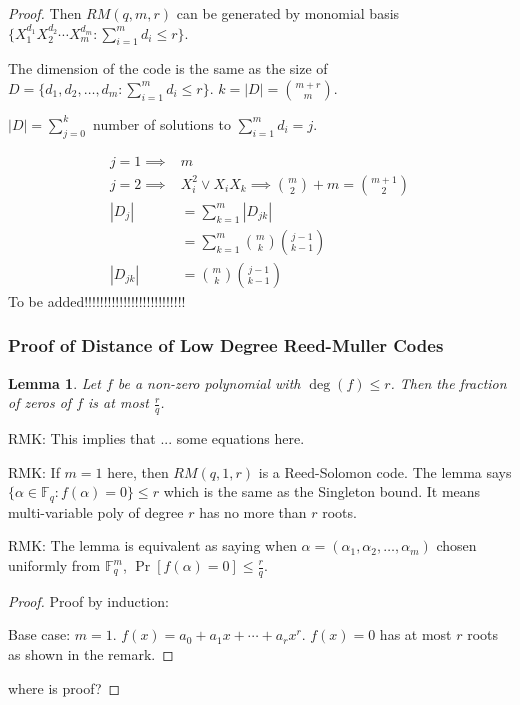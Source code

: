\documentclass[letterpaper,12pt]{article}
\newtheorem{lemma}{Lemma}
\begin{document}
\begin{proof}
    Then $RM(q,m,r)$ can be generated by monomial basis $\{X_1^{d_1}X_2^{d_2}\cdots X_m^{d_m}: \sum_{i=1}^{m}d_i\le r\}$.

    The dimension of the code is the same as the size of $D=\{d_1,d_2,\ldots,d_m: \sum_{i=1}^{m}d_i\le r\}$. $k=|D|=\binom{m+r}{m}$.

    $|D|=\sum_{j=0}^{k}$ number of solutions to $\sum_{i=1}^{m}d_i=j$.

    \begin{align*}
        j=1 \implies & m \\ 
        j=2 \implies & X_i^2 \lor X_i X_k\implies \binom{m}{2} + m = \binom{m+1}{2} \\
        |D_j| & =  \sum_{k=1}^{m} |D_{jk}| \\
        & = \sum_{k=1}^{m} \binom{m}{k} \binom{j-1}{k-1} \\
        |D_{jk}| & = \binom{m}{k} \binom{j-1}{k-1}
    \end{align*}
    To be added!!!!!!!!!!!!!!!!!!!!!!!!!!

\subsubsection{Proof of Distance of Low Degree Reed-Muller Codes}
\begin{lemma}
    Let $f$ be a non-zero polynomial with $\deg(f)\le r$. Then the fraction of zeros of $f$ is at most $\frac{r}{q}$. 
\end{lemma}
RMK: This implies that ... some equations here.

RMK: If $m=1$ here, then $RM(q,1,r)$ is a Reed-Solomon code. The lemma says $\{\alpha\in\mathbb{F}_q : f(\alpha)=0\}\le r$ which is the same as the Singleton bound. It means multi-variable poly of degree $r$ has no more than $r$ roots. 

RMK: The lemma is equivalent as saying when $\alpha = (\alpha_1,\alpha_2,\ldots,\alpha_m)$ chosen uniformly from $\mathbb{F}_q^m$, $\Pr[f(\alpha)=0]\le \frac{r}{q}$.

\begin{proof}
    Proof by induction: 

    Base case: $m=1$. $f(x)=a_0+a_1x+\cdots+a_r x^r$. $f(x)=0$ has at most $r$ roots as shown in the remark.
\end{proof}


where is proof?







\end{proof}
\end{document}
